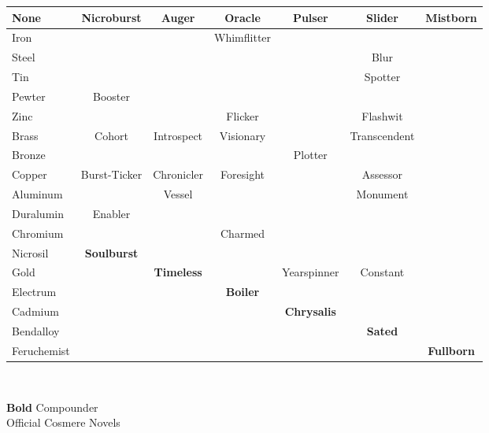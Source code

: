 \documentclass[conference]{IEEEtran}
\newcommand{\cbox}[1]{\raisebox{\depth}{\fcolorbox{black}{#1}{\null}}}
\newcommand{\n}{\hfill\break}
\begin{document}
\begin{table}[h]
\begin{center}
\begin{tabular}{|l |c |c |c |c |c |c | }
		\hline
		None&\cellcolor{darkgreen}Nicroburst&\cellcolor{darkgreen}Auger&\cellcolor{darkgreen}Oracle&\cellcolor{darkgreen}Pulser&\cellcolor{darkgreen}Slider&\cellcolor{darkgreen}Mistborn\\\hline
		Iron& & &\cellcolor{lightgreen}Whimflitter& & & \\\hline
		Steel& & & & &\cellcolor{lightgreen} Blur& \\\hline
		Tin& & & & & \cellcolor{lightgreen}Spotter & \\\hline
		Pewter&\cellcolor{lightgreen}Booster& & & & & \\\hline
		Zinc & & &\cellcolor{lightgreen}Flicker& &\cellcolor{lightgreen}Flashwit& \\\hline
		Brass &\cellcolor{lightorange}Cohort&\cellcolor{lightorange}Introspect &\cellcolor{lightred} Visionary & &\cellcolor{lightorange}Transcendent & \\\hline
		Bronze&& & &\cellcolor{lightgreen}Plotter & & \\\hline
		Copper&\cellcolor{lightgreen}Burst-Ticker &\cellcolor{lightgreen} Chronicler & \cellcolor{lightgreen}Foresight & &  \cellcolor{lightgreen}Assessor& \\\hline
		Aluminum & & \cellcolor{lightgreen} Vessel& & &\cellcolor{lightgreen}Monument& \\\hline
		Duralumin&\cellcolor{lightgreen}Enabler& & & & & \\\hline
		Chromium &  & & \cellcolor{lightgreen}Charmed &  &  &  \\\hline
		Nicrosil& \cellcolor{lightgreen}\textbf{Soulburst} & &  &  &  &  \\\hline
		Gold&  & \cellcolor{lightgreen}\textbf{Timeless} &  &\cellcolor{lightgreen} Yearspinner &\cellcolor{lightgreen} Constant &  \\\hline
		Electrum& & &\cellcolor{lightred}\textbf{Boiler} & & & \\\hline
		Cadmium&   & &  & \cellcolor{lightgreen}\textbf{Chrysalis} &  &  \\\hline
		Bendalloy  &  & &  &  & \cellcolor{lightgreen}\textbf{Sated} &  \\\hline
		Feruchemist&  & & &  &  & \cellcolor{yellow} \textbf{Fullborn}\\\hline
	\end{tabular}\\\n
\end{center}
	\textbf{Bold} Compounder\\
	\cbox{darkgreen} Official Cosmere Novels\cite{ARS}\\

\end{table}
\end{document}
